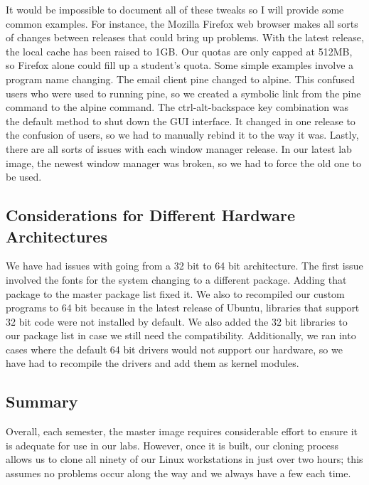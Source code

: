 It would be impossible to document all of these tweaks so I will provide some common examples.  For instance, the Mozilla Firefox web browser makes all sorts of changes between releases that could bring up problems.  With the latest release, the local cache has been raised to 1GB.  Our quotas are only capped at 512MB, so Firefox alone could fill up a student's quota.  Some simple examples involve a program name changing.  The email client pine changed to alpine.  This confused users who were used to running pine, so we created a symbolic link from the pine command to the alpine command.  The ctrl-alt-backspace key combination was the default method to shut down the GUI interface.  It changed in one release to the confusion of users, so we had to manually rebind it to the way it was.  Lastly, there are all sorts of issues with each window manager release.  In our latest lab image, the newest window manager was broken, so we had to force the old one to be used.  

\subsection{Considerations for Different Hardware Architectures} 
We have had issues with going from a 32 bit to 64 bit architecture.  The first issue involved the fonts for the system changing to a different package.  Adding that package to the master package list fixed it.  We also to recompiled our custom programs to 64 bit because in the latest release of Ubuntu, libraries that support 32 bit code were not installed by default.  We also added the 32 bit libraries to our package list in case we still need the compatibility.  Additionally, we ran into cases where the default 64 bit drivers would not support our hardware, so we have had to recompile the drivers and add them as kernel modules.  

\subsection{Summary}
Overall, each semester, the master image requires considerable effort to ensure it is adequate for use in our labs.  However, once it is built, our cloning process allows us to clone all ninety of our Linux workstations in just over two hours; this assumes no problems occur along the way and we always have a few each time. 
